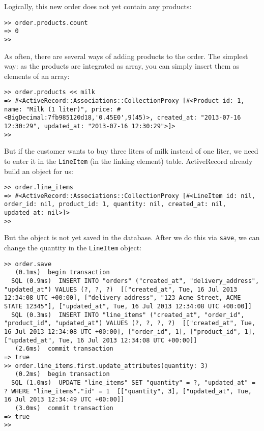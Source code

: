 \documentclass[a4paper]{book}
\newcounter{tab}[chapter]
\begin{document}
Logically, this new order does not yet contain any products:

\begin{shaded}\begin{verbatim}
>> order.products.count
=> 0
>>
\end{verbatim}\end{shaded}

As often, there are several ways of adding products to the order. The simplest way: as the products are integrated as array, you can simply insert them as elements of an array:

\begin{shaded}\begin{verbatim}
>> order.products << milk
=> #<ActiveRecord::Associations::CollectionProxy [#<Product id: 1, name: "Milk (1 liter)", price: #<BigDecimal:7fb985120d18,'0.45E0',9(45)>, created_at: "2013-07-16 12:30:29", updated_at: "2013-07-16 12:30:29">]>
>>
\end{verbatim}\end{shaded}

But if the customer wants to buy three liters of milk instead of one liter, we need to enter it in the \texttt{LineItem} (in the linking element) table. ActiveRecord already build an object for us:

\begin{shaded}\begin{verbatim}
>> order.line_items
=> #<ActiveRecord::Associations::CollectionProxy [#<LineItem id: nil, order_id: nil, product_id: 1, quantity: nil, created_at: nil, updated_at: nil>]>
>>
\end{verbatim}\end{shaded}

But the object is not yet saved in the database. After we do this via \texttt{save}, we can change the quantity in the \texttt{LineItem} object:

\begin{shaded}\begin{verbatim}
>> order.save
   (0.1ms)  begin transaction
  SQL (0.9ms)  INSERT INTO "orders" ("created_at", "delivery_address", "updated_at") VALUES (?, ?, ?)  [["created_at", Tue, 16 Jul 2013 12:34:08 UTC +00:00], ["delivery_address", "123 Acme Street, ACME STATE 12345"], ["updated_at", Tue, 16 Jul 2013 12:34:08 UTC +00:00]]
  SQL (0.3ms)  INSERT INTO "line_items" ("created_at", "order_id", "product_id", "updated_at") VALUES (?, ?, ?, ?)  [["created_at", Tue, 16 Jul 2013 12:34:08 UTC +00:00], ["order_id", 1], ["product_id", 1], ["updated_at", Tue, 16 Jul 2013 12:34:08 UTC +00:00]]
   (2.6ms)  commit transaction
=> true
>> order.line_items.first.update_attributes(quantity: 3)
   (0.2ms)  begin transaction
  SQL (1.0ms)  UPDATE "line_items" SET "quantity" = ?, "updated_at" = ? WHERE "line_items"."id" = 1  [["quantity", 3], ["updated_at", Tue, 16 Jul 2013 12:34:49 UTC +00:00]]
   (3.0ms)  commit transaction
=> true
>>
\end{verbatim}\end{shaded}
\end{document}
